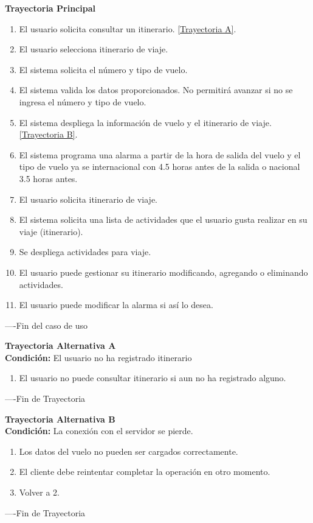 \begin{flushleft}
	\textbf{Trayectoria Principal}\\
	\begin{enumerate}
		\item El usuario solicita consultar un itinerario. \hyperlink{TrayectoriaA_CU-U-06}{[Trayectoria A]}.
		\item El usuario selecciona itinerario de viaje. 
		\item El sistema solicita el  número y tipo de vuelo.
		\item El sistema valida los datos proporcionados. No permitirá avanzar si no se ingresa el número y tipo de vuelo.
		\item El sistema despliega la información de vuelo y el itinerario de viaje. \hyperlink{TrayectoriaB_CU-U-06}{[Trayectoria B]}.
		\item El sistema programa una alarma a partir de la hora de salida del vuelo y el tipo de vuelo ya se internacional con 4.5 horas antes de la salida o nacional 3.5 horas antes.
		\item El usuario solicita itinerario de viaje.
		\item	El sistema solicita una lista de actividades que el usuario gusta realizar en su viaje (itinerario).
		\item Se despliega actividades para viaje.
		\item El usuario puede gestionar su itinerario modificando, agregando o eliminando actividades.
		\item El usuario puede modificar la alarma si así lo desea.
	\end{enumerate}
\end{flushleft}
----Fin del caso de uso

\begin{flushleft}
	\hypertarget{TrayectoriaA_CU-U-06}{}
	\textbf{Trayectoria Alternativa A}\\
	\textbf{Condición:} El usuario no ha registrado itinerario\\
	\begin{enumerate}
		\item El usuario no puede consultar itinerario si aun no ha registrado alguno.
	\end{enumerate}
\end{flushleft}
----Fin de Trayectoria

\begin{flushleft}
	\hypertarget{TrayectoriaB_CU-U-06}{}
	\textbf{Trayectoria Alternativa B}\\
	\textbf{Condición:} La conexión con el servidor se pierde. \\
	\begin{enumerate}
		\item Los datos del vuelo no pueden ser cargados correctamente. 
		\item El cliente debe reintentar completar la operación en otro momento. 
		\item Volver a 2. 
	\end{enumerate}
\end{flushleft}
----Fin de Trayectoria


